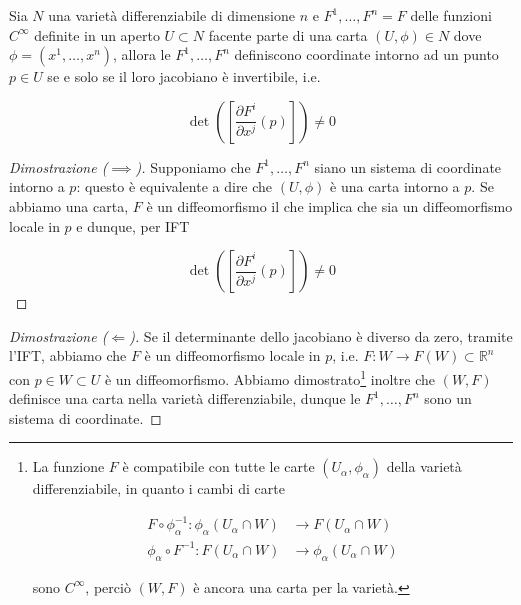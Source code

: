 \begin{corollary}[IFT]\label{ift-cor}
	Sia $ N $ una varietà differenziabile di dimensione $ n $ e $ F^{1},\dots,F^{n} = F $ delle funzioni $ C^{\infty} $ definite in un aperto $ U \subset N $ facente parte di una carta $ (U,\phi) \in N $ dove $ \phi = (x^{1},\dots,x^{n}) $, allora le $ F^{1},\dots,F^{n} $ definiscono coordinate intorno ad un punto $ p \in U $ se e solo se il loro jacobiano è invertibile, i.e.
	
	\begin{equation}
		\det( \left[ \dfrac{\partial F^{i}}{\partial x^{j}} (p) \right] ) \neq 0
	\end{equation}
\end{corollary}

\begin{proof}[Dimostrazione ($ \implies $)]
	Supponiamo che $ F^{1},\dots,F^{n} $ siano un sistema di coordinate intorno a $ p $: questo è equivalente a dire che $ (U,\phi) $ è una carta intorno a $ p $. Se abbiamo una carta, $ F $ è un diffeomorfismo il che implica che sia un diffeomorfismo locale in $ p $ e dunque, per IFT
	
	\begin{equation}
		\det( \left[ \dfrac{\partial F^{i}}{\partial x^{j}} (p) \right] ) \neq 0
	\end{equation}
\end{proof}

\begin{proof}[Dimostrazione ($ \Longleftarrow $)]
	Se il determinante dello jacobiano è diverso da zero, tramite l'IFT, abbiamo che $ F $ è un diffeomorfismo locale in $ p $, i.e. $ F : W \to F(W) \subset \mathbb{R}^{n} $ con $ p \in W \subset U $ è un diffeomorfismo. Abbiamo dimostrato\footnote{%
		La funzione $ F $ è compatibile con tutte le carte $ (U_{\alpha},\phi_{\alpha}) $ della varietà differenziabile, in quanto i cambi di carte
		
		\begin{align*}
				F \circ \phi_{\alpha}^{-1} : \phi_{\alpha}(U_{\alpha} \cap W) &\to F(U_{\alpha} \cap W)\\
				\phi_{\alpha} \circ F^{-1} : F(U_{\alpha} \cap W) &\to \phi_{\alpha}(U_{\alpha} \cap W)
		\end{align*}
		
		sono $ C^{\infty} $, perciò $ (W,F) $ è ancora una carta per la varietà.%
	} inoltre che $ (W,F) $ definisce una carta nella varietà differenziabile, dunque le $ F^{1},\dots,F^{n} $ sono un sistema di coordinate.
\end{proof}


